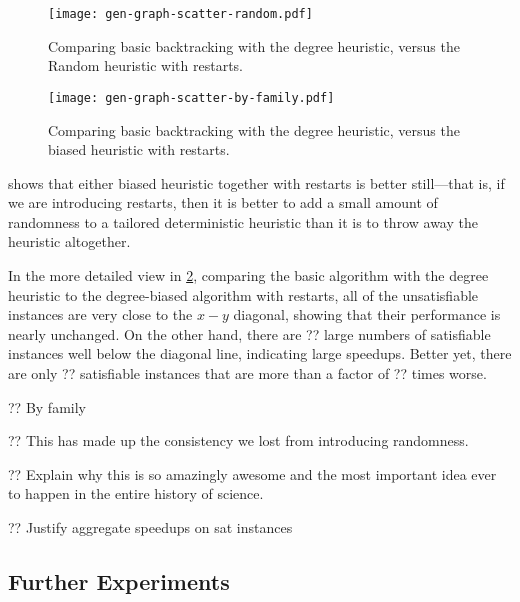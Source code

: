 \documentclass{article}
\begin{document}
\begin{figure}[p]
    \centering
    \texttt{[image: gen-graph-scatter-random.pdf]}
    \caption{Comparing basic backtracking with the degree heuristic, versus the Random heuristic
    with restarts.}
    \label{figure:scatter-random}
\end{figure}

\begin{figure}[p]
    \centering
    \texttt{[image: gen-graph-scatter-by-family.pdf]}

    \caption{Comparing basic backtracking with the degree heuristic, versus the biased
    heuristic with restarts.}
    \label{figure:scatter-by-family}
\end{figure}

 shows that either biased heuristic together with restarts is better
still---that is, if we are introducing restarts, then it is better to add a small amount of
randomness to a tailored deterministic heuristic than it is to throw away the heuristic altogether.

In the more detailed view in \cref{figure:scatter-by-family}, comparing the basic algorithm with the
degree heuristic to the degree-biased algorithm with restarts, all of the unsatisfiable instances
are very close to the $x-y$ diagonal, showing that their performance is nearly unchanged. On the
other hand, there are ?? large numbers of satisfiable instances well below the diagonal line,
indicating large speedups.  Better yet, there are only ?? satisfiable instances that are more than a
factor of ?? times worse.

?? By family

?? This has made up the consistency we lost from introducing randomness.

?? Explain why this is so amazingly awesome and the most important idea ever to happen in the entire
history of science.

?? Justify aggregate speedups on sat instances

\subsection{Further Experiments}
\end{document}

